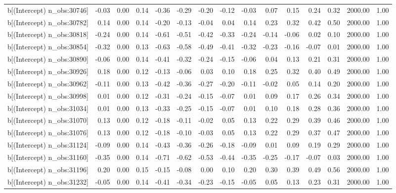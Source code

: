 \begin{table}[ht]
\begin{tabular}{rrrrrrrrrrrrrrr}
  b[(Intercept) n\_obs:30746] & -0.03 & 0.00 & 0.14 & -0.36 & -0.29 & -0.20 & -0.12 & -0.03 & 0.07 & 0.15 & 0.24 & 0.32 & 2000.00 & 1.00 \\ 
  b[(Intercept) n\_obs:30782] & 0.14 & 0.00 & 0.14 & -0.20 & -0.13 & -0.04 & 0.04 & 0.14 & 0.23 & 0.32 & 0.42 & 0.50 & 2000.00 & 1.00 \\ 
  b[(Intercept) n\_obs:30818] & -0.24 & 0.00 & 0.14 & -0.61 & -0.51 & -0.42 & -0.33 & -0.24 & -0.14 & -0.06 & 0.02 & 0.10 & 2000.00 & 1.00 \\ 
  b[(Intercept) n\_obs:30854] & -0.32 & 0.00 & 0.13 & -0.63 & -0.58 & -0.49 & -0.41 & -0.32 & -0.23 & -0.16 & -0.07 & 0.01 & 2000.00 & 1.00 \\ 
  b[(Intercept) n\_obs:30890] & -0.06 & 0.00 & 0.14 & -0.41 & -0.32 & -0.24 & -0.15 & -0.06 & 0.04 & 0.13 & 0.21 & 0.31 & 2000.00 & 1.00 \\ 
  b[(Intercept) n\_obs:30926] & 0.18 & 0.00 & 0.12 & -0.13 & -0.06 & 0.03 & 0.10 & 0.18 & 0.25 & 0.32 & 0.40 & 0.49 & 2000.00 & 1.00 \\ 
  b[(Intercept) n\_obs:30962] & -0.11 & 0.00 & 0.13 & -0.42 & -0.36 & -0.27 & -0.20 & -0.11 & -0.02 & 0.05 & 0.14 & 0.20 & 2000.00 & 1.00 \\ 
  b[(Intercept) n\_obs:30998] & 0.01 & 0.00 & 0.12 & -0.31 & -0.24 & -0.15 & -0.07 & 0.01 & 0.09 & 0.17 & 0.26 & 0.34 & 2000.00 & 1.00 \\ 
  b[(Intercept) n\_obs:31034] & 0.01 & 0.00 & 0.13 & -0.33 & -0.25 & -0.15 & -0.07 & 0.01 & 0.10 & 0.18 & 0.28 & 0.36 & 2000.00 & 1.00 \\ 
  b[(Intercept) n\_obs:31070] & 0.13 & 0.00 & 0.12 & -0.18 & -0.11 & -0.02 & 0.05 & 0.13 & 0.22 & 0.29 & 0.39 & 0.46 & 2000.00 & 1.00 \\ 
  b[(Intercept) n\_obs:31076] & 0.13 & 0.00 & 0.12 & -0.18 & -0.10 & -0.03 & 0.05 & 0.13 & 0.22 & 0.29 & 0.37 & 0.47 & 2000.00 & 1.00 \\ 
  b[(Intercept) n\_obs:31124] & -0.09 & 0.00 & 0.14 & -0.43 & -0.36 & -0.26 & -0.18 & -0.09 & 0.01 & 0.09 & 0.19 & 0.29 & 2000.00 & 1.00 \\ 
  b[(Intercept) n\_obs:31160] & -0.35 & 0.00 & 0.14 & -0.71 & -0.62 & -0.53 & -0.44 & -0.35 & -0.25 & -0.17 & -0.07 & 0.03 & 2000.00 & 1.00 \\ 
  b[(Intercept) n\_obs:31196] & 0.20 & 0.00 & 0.15 & -0.15 & -0.08 & 0.00 & 0.10 & 0.20 & 0.30 & 0.39 & 0.49 & 0.56 & 2000.00 & 1.00 \\ 
  b[(Intercept) n\_obs:31232] & -0.05 & 0.00 & 0.14 & -0.41 & -0.34 & -0.23 & -0.15 & -0.05 & 0.05 & 0.13 & 0.23 & 0.31 & 2000.00 & 1.00 \\ 

\end{tabular}
\end{table}
